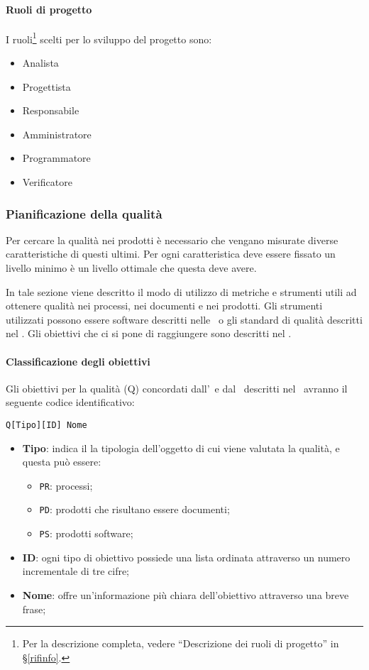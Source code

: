 			\paragraph{Ruoli di progetto}
			I ruoli\footnote{Per la descrizione completa, vedere ``Descrizione dei ruoli di progetto'' in \S\ref{rifinfo}.} scelti per lo sviluppo del progetto sono:
			\begin{itemize}[noitemsep]
				\item Analista
				\item Progettista
				\item Responsabile
				\item Amministratore
				\item Programmatore
				\item Verificatore
			\end{itemize}


		\subsubsection{Pianificazione della qualità}\label{Pianificazione qualita}
		Per cercare la qualità nei prodotti è necessario che vengano misurate diverse caratteristiche di questi ultimi.
		Per ogni caratteristica deve essere fissato un livello minimo è un livello ottimale che questa deve avere.

		In tale sezione viene descritto il modo di utilizzo di metriche e strumenti utili ad ottenere qualità nei processi, nei documenti e nei prodotti.
		Gli strumenti utilizzati possono essere software descritti nelle \NdP\ o gli standard di qualità descritti nel \Doc{\PdQv}.
		Gli obiettivi che ci si pone di raggiungere sono descritti nel \PdQ.

			\paragraph{Classificazione degli obiettivi}
			Gli obiettivi per la qualità (Q) concordati dall'\Amm\ e dal \Ver\ descritti nel \PdQ\ avranno il seguente codice identificativo:

			\begin{center}
				\texttt{Q[Tipo][ID] Nome}
			\end{center}

			\begin{itemize}
				\item \textbf{Tipo}: indica il la tipologia dell'oggetto di cui viene valutata la qualità, e questa può essere:
				\begin{itemize}
					\item \texttt{PR}: processi;
					\item \texttt{PD}: prodotti che risultano essere documenti;
					\item \texttt{PS}: prodotti software;
				\end{itemize}

				\item \textbf{ID}: ogni tipo di obiettivo possiede una lista ordinata attraverso un numero incrementale di tre cifre;
				\item \textbf{Nome}: offre un'informazione più chiara dell'obiettivo attraverso una breve frase;
			\end{itemize}

